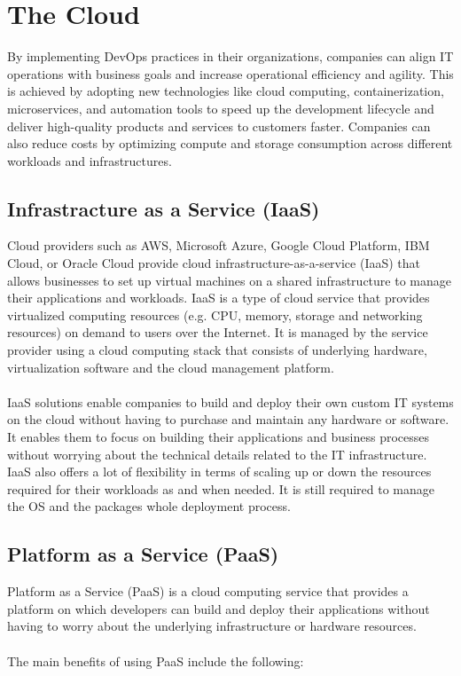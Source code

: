 \documentclass[BIF,Master,nenglish]{twbook}%
\begin{document}
\section{The Cloud}
By implementing DevOps practices in their organizations, companies can align IT operations with business goals and increase operational efficiency and agility. This is achieved by adopting new technologies like cloud computing, containerization, microservices, and automation tools to speed up the development lifecycle and deliver high-quality products and services to customers faster. Companies can also reduce costs by optimizing compute and storage consumption across different workloads and infrastructures.\cite{qia2009}

\subsection{Infrastracture as a Service (IaaS)}
Cloud providers such as AWS, Microsoft Azure, Google Cloud Platform, IBM Cloud, or Oracle Cloud provide cloud infrastructure-as-a-service (IaaS) that allows businesses to set up virtual machines on a shared infrastructure to manage their applications and workloads. IaaS is a type of cloud service that provides virtualized computing resources (e.g. CPU, memory, storage and networking resources) on demand to users over the Internet. It is managed by the service provider using a cloud computing stack that consists of underlying hardware, virtualization software and the cloud management platform.\cite{buy2019} 
\\
\\
IaaS solutions enable companies to build and deploy their own custom IT systems on the cloud without having to purchase and maintain any hardware or software. It enables them to focus on building their applications and business processes without worrying about the technical details related to the IT infrastructure. IaaS also offers a lot of flexibility in terms of scaling up or down the resources required for their workloads as and when needed. It is still required to manage the OS and the packages whole deployment process.

\subsection{Platform as a Service (PaaS)}
Platform as a Service (PaaS) is a cloud computing service that provides a platform on which developers can build and deploy their applications without having to worry about the underlying infrastructure or hardware resources. 
\\
\\
The main benefits of using PaaS include the following: 
\end{document}
